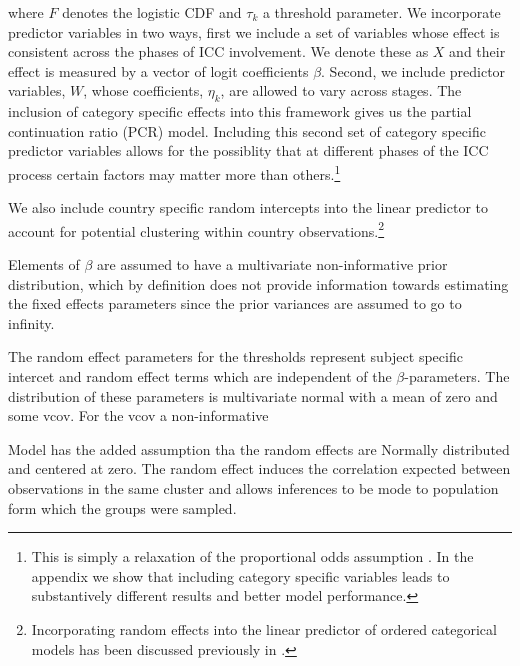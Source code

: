 where $F$ denotes the logistic CDF and $\tau_{k}$ a threshold parameter. We incorporate predictor variables in two ways, first we include  a set of variables whose effect is consistent across the phases of ICC involvement. We denote these as $X$ and their effect is measured by a vector of logit coefficients $\beta$. Second, we include predictor variables, $W$, whose coefficients, $\eta_{k}$, are allowed to vary across stages. The inclusion of category specific effects into this framework gives us the partial continuation ratio (PCR) model. Including this second set of category specific predictor variables allows for the possiblity that at different phases of the ICC process certain factors may matter more than others.\footnote{This is simply a relaxation of the proportional odds assumption \citep{peterson1990partial}. In the appendix we show that including category specific variables leads to substantively different results and better model performance.}

We also include country specific random intercepts into the linear predictor to account for potential clustering within country observations.\footnote{ Incorporating random effects into the linear predictor of ordered categorical models has been discussed previously in \citet{have:uttal:1994, tutz:hennevogl:1996,dos2000continuation,hartzel2001multinomial}.}


Elements of $\beta$ are assumed to have a multivariate non-informative prior distribution, which by definition does not provide information towards estimating the fixed effects parameters since the prior variances are assumed to go to infinity.

The random effect parameters for the thresholds represent subject specific intercet and random effect terms which are independent of the $\beta$-parameters. The distribution of these parameters is multivariate normal with a mean of zero and some vcov. For the vcov a non-informative

Model has the added assumption tha the random effects are Normally distributed and centered at zero. The random effect induces the correlation expected between observations in the same cluster and allows inferences to be mode to population form which the groups were sampled.




